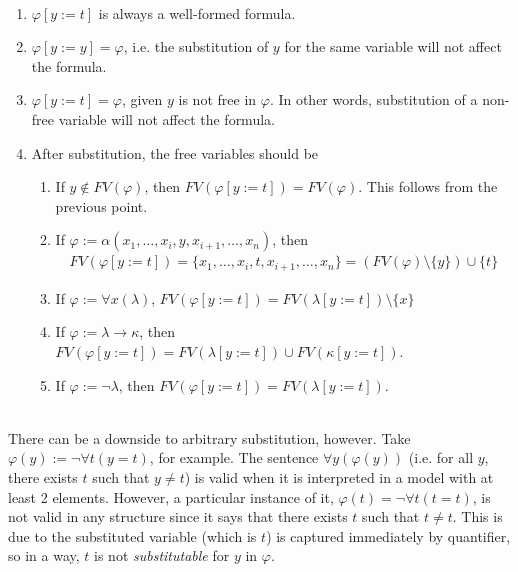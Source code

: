 \documentclass{treatise}
\begin{document}
\begin{remark} \ 
\begin{enumerate}
    \item $\varphi[y := t]$ is always a well-formed formula.
    \item $\varphi[y := y] = \varphi$, i.e. the substitution of $y$ for the same variable will not affect the formula.
    \item $\varphi[y := t] = \varphi$, given $y$ is not free in $\varphi$. In other words, substitution of a non-free variable will not affect the formula.
    \item After substitution, the free variables should be
    \begin{enumerate}
        \item If $y \notin FV(\varphi)$, then $FV(\varphi[y := t]) = FV(\varphi)$. This follows from the previous point.
        \item If $\varphi := \alpha(x_1, \hdots, x_i, y, x_{i + 1}, \hdots, x_n)$, then
        \begin{align*}
            FV(\varphi[y := t]) = \{ x_1, \hdots, x_i, t, x_{i + 1}, \hdots, x_n \} = (FV(\varphi) \setminus \{ y \}) \cup \{ t \}
        \end{align*}
        \item If $\varphi := \forall x (\lambda)$, $FV(\varphi[y := t]) = FV(\lambda[y := t]) \setminus \{ x \}$
        \item If $\varphi := \lambda \to \kappa$, then $FV(\varphi[y := t]) = FV(\lambda[y := t]) \cup FV(\kappa [y := t])$.
        \item If $\varphi := \neg\lambda$, then $FV(\varphi[y := t]) = FV(\lambda[y := t])$.
    \end{enumerate}
\end{enumerate}
\end{remark}
\ \\
There can be a downside to arbitrary substitution, however. Take $\varphi(y) := \neg \forall t (y = t)$, for example. The sentence $\forall y (\varphi(y))$ (i.e. for all $y$, there exists $t$ such that $y \neq t$) is valid when it is interpreted in a model with at least 2 elements. However, a particular instance of it, $\varphi(t) = \neg \forall t (t = t)$, is not valid in any structure since it says that there exists $t$ such that $t \neq t$. This is due to the substituted variable (which is $t$) is captured immediately by quantifier, so in a way, $t$ is not \textit{substitutable} for $y$ in $\varphi$.
\\
\\
\end{document}
